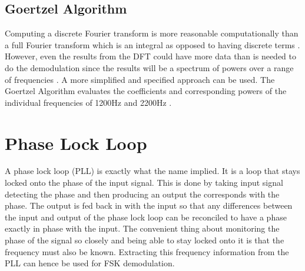 \subsection{Goertzel Algorithm}
Computing a discrete Fourier transform is more reasonable computationally than a full Fourier transform which is an integral as opposed to having discrete terms \cite{WikipediaFT}. However, even the results from the DFT could have more data than is needed to do the demodulation since the results will be a spectrum of powers over a range of frequencies \cite{WikipediaDFT,WikipediaFFT}. A more simplified and specified approach can be used. The Goertzel Algorithm evaluates the coefficients and corresponding powers of the individual frequencies of 1200Hz and 2200Hz \cite{WikipediaGA,Elmenreich2011}. 

\section{Phase Lock Loop}
A phase lock loop (PLL) is exactly what the name implied. It is a loop that stays locked onto the phase of the input signal. This is done by taking input signal detecting the phase and then producing an output the corresponds with the phase. The output is fed back in with the input so that any differences between the input and output of the phase lock loop can be reconciled to have a phase exactly in phase with the input. The convenient thing about monitoring the phase of the signal so closely and being able to stay locked onto it is that the frequency must also be known. Extracting this frequency information from the PLL can hence be used for FSK demodulation.

